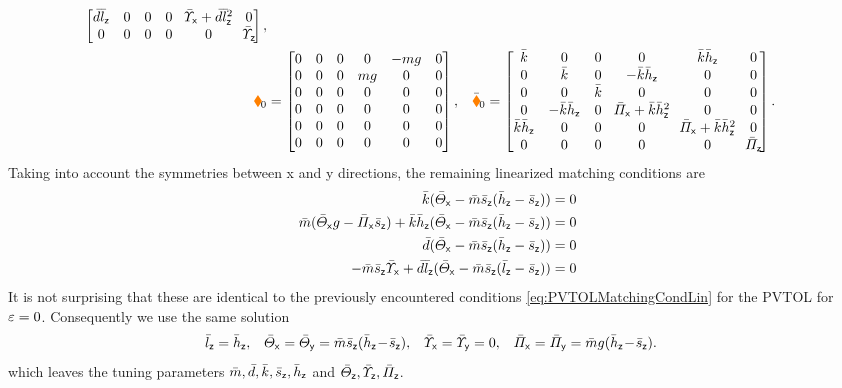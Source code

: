 \begin{subequations}
\begin{align*}
\begin{bmatrix}
  \dc\lcz & 0 & 0 & 0 & \!\sigcx+\dc\lcz^2\! & 0 \\
  0 & 0 & 0 & 0 & 0 & \!\sigcz\! \\
 \end{bmatrix},
\\ 
 \sysStiffMatLin &= 
 \begin{bmatrix}
  0 & 0 & 0 & 0 & -m\gravityAccConst & 0 \\
  0 & 0 & 0 & m\gravityAccConst & 0 & 0 \\
  0 & 0 & 0 & 0 & 0 & 0 \\
  0 & 0 & 0 & 0 & 0 & 0 \\
  0 & 0 & 0 & 0 & 0 & 0 \\
  0 & 0 & 0 & 0 & 0 & 0 \\
  \end{bmatrix},&
 \sysStiffMatCLin &=
 \begin{bmatrix}
  \kc & 0 & 0 & 0 & \kc\hcz & 0 \\
  0 & \kc & 0 & -\kc\hcz & 0 & 0 \\
  0 & 0 & \kc & 0 & 0 & 0 \\
  0 & -\kc\hcz & 0 & \!\kapcx+\kc\hcz^2\! & 0 & 0 \\
  \kc\hcz & 0 & 0 & 0 & \!\kapcx+\kc\hcz^2\! & 0 \\
  0 & 0 & 0 & 0 & 0 & \!\kapcz\! \\
 \end{bmatrix}.
\end{align*}
\end{subequations}
Taking into account the symmetries between x and y directions, the remaining linearized matching conditions are
\begin{subequations}
\begin{align}
 \kc(\Jcx - \mc\scz(\hcz - \scz)) &= 0
\\
 \mc(\Jcx\gravityAccConst - \kapcx\scz) + \kc\hcz(\Jcx - \mc\scz(\hcz - \scz)) &= 0
\\
 \dc(\Jcx - \mc\scz(\hcz - \scz)) &= 0
\\
 -\mc\scz\sigcx + \dc\lcz(\Jcx - \mc\scz(\lcz - \scz)) &= 0
\end{align} 
\end{subequations}
It is not surprising that these are identical to the previously encountered conditions \eqref{eq:PVTOLMatchingCondLin} for the PVTOL for $\eps=0$.
Consequently we use the same solution
\begin{align}
 \lcz &= \hcz,&
 \Jcx = \Jcy &= \mc\scz(\hcz \!-\! \scz),&
 \sigcx = \sigcy &= 0,&
 \kapcx = \kapcy &= \mc\gravityAccConst(\hcz \!-\! \scz).
\end{align}
which leaves the tuning parameters $\mc, \dc, \kc, \scz, \hcz$ and $\Jcz, \sigcz, \kapcz$.


